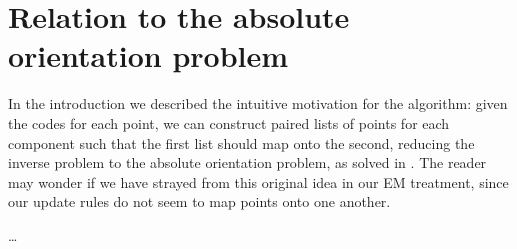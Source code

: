 \documentclass[10pt,a4paper,oneside]{article}
\theoremstyle{definition}
\theoremstyle{definition}
\begin{document}
\section{Relation to the absolute orientation problem}

In the introduction we described the intuitive motivation for the algorithm: given the codes for each point, we can construct paired lists of points for each component such that the first list should map onto the second, reducing the inverse problem to the absolute orientation problem, as solved in \cite{umeyama1991least}. The reader may wonder if we have strayed from this original idea in our EM treatment, since our update rules do not seem to map points onto one another.   

\ldots
\end{document}
